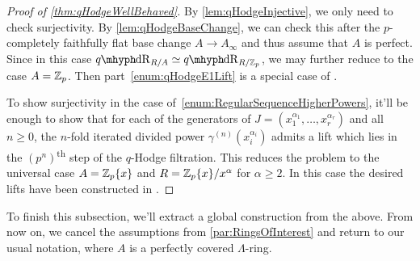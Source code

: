 \documentclass[DIV=12,numbers=enddot,leqno,bibliography=totoc]{scrartcl}
\begin{document}
	\begin{proof}[Proof of \cref{thm:qHodgeWellBehaved}]
		By \cref{lem:qHodgeInjective}, we only need to check surjectivity. By \cref{lem:qHodgeBaseChange}, we can check this after the $p$-completely faithfully flat base change $A\rightarrow A_\infty$ and thus assume that $A$ is perfect. Since in this case $\qdeRham_{R/A}\simeq \qdeRham_{R/\IZ_p}$, we may further reduce to the case $A=\mathbb{Z}_p$. Then part~\cref{enum:qHodgeE1Lift} is a special case of \cite[Theorem~]{qdeRhamku}.
		
		To show surjectivity in the case of~\cref{enum:RegularSequenceHigherPowers}, it'll be enough to show that for each of the generators of $J=(x_1^{\alpha_1},\dotsc,x_r^{\alpha_r})$ and all $n\geqslant 0$, the $n$-fold iterated divided power $\gamma^{(n)}(x_i^{\alpha_i})$ admits a lift which lies in the $(p^n)$\textsuperscript{th} step of the $q$-Hodge filtration. This reduces the problem to the universal case $A=\mathbb{Z}_p\{x\}$ and $R=\mathbb{Z}_p\{x\}/x^\alpha$ for $\alpha\geqslant 2$. In this case the desired lifts have been constructed in \cite[Lemma~]{qHodge}.
	\end{proof}
	
	To finish this subsection, we'll extract a global construction from the above. From now on, we cancel the assumptions from \cref{par:RingsOfInterest} and return to our usual notation, where $A$ is a perfectly covered $\Lambda$-ring.
	
\end{document}
